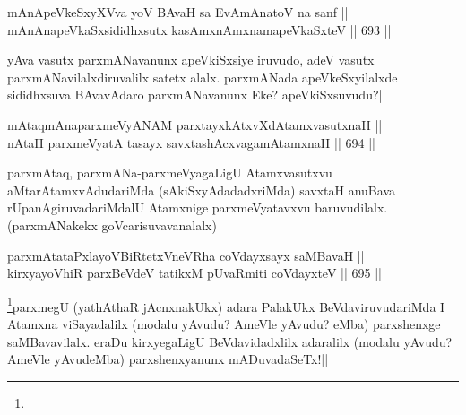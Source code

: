 
\begin{shl}
mAnApeVkeSxyXVva yoV BAvaH sa EvAmAnatoV na sanf || \\
mAnAnapeVkaSxsididhxsutx kasAmxnAmxnamapeVkaSxteV ||  693 ||  
\end{shl}

\begin{artha} 
yAva vasutx parxmANavanunx apeVkiSxsiye iruvudo, adeV vasutx 
parxmANavilalxdiruvalilx satetx alalx. parxmANada apeVkeSxyilalxde 
sididhxsuva BAvavAdaro parxmANavanunx Eke? apeVkiSxsuvudu?||
\end{artha}


\begin{shl}
mAtaqmAnaparxmeVyANAM parxtayxkAtxvXdAtamxvasutxnaH || \\
nAtaH parxmeVyatA tasayx savxtashAcxvagamAtamxnaH ||  694 ||  
\end{shl}

\begin{artha} 
parxmAtaq, parxmANa-parxmeVyagaLigU Atamxvasutxvu 
aMtarAtamxvAdudariMda (sAkiSxyAdadadxriMda) savxtaH anuBava 
rUpanAgiruvadariMdalU Atamxnige parxmeVyatavxvu baruvudilalx. 
(parxmANakekx goVcarisuvavanalalx)
\end{artha}


\begin{shl}
parxmAtataPxlayoVBiRtetxVneVRha coVdayxsayx saMBavaH || \\
kirxyayoVhiR parxBeVdeV tatikxM pUvaRmiti coVdayxteV ||  695 ||  
\end{shl}

\begin{artha} 
\footnote[1]{}parxmegU (yathAthaR jAcnxnakUkx) adara PalakUkx 
BeVdaviruvudariMda I Atamxna viSayadalilx (modalu yAvudu? AmeVle 
yAvudu? eMba) parxshenxge saMBavavilalx. eraDu kirxyegaLigU 
BeVdavidadxlilx adaralilx (modalu yAvudu? AmeVle yAvudeMba) 
parxshenxyanunx mADuvadaSeTx!||
\end{artha}

